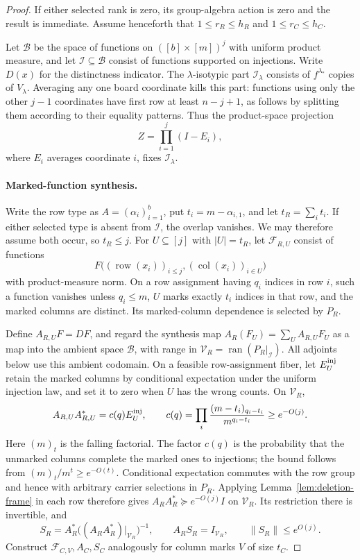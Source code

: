 \begin{proof}
If either selected rank is zero, its group-algebra action is zero and the result is immediate. Assume henceforth that $1\le r_R\le h_R$ and $1\le r_C\le h_C$.

Let $\mathcal B$ be the space of functions on $([b]\times[m])^j$ with uniform product measure, and let $\mathcal I\subseteq\mathcal B$ consist of functions supported on injections. Write $D(x)$ for the distinctness indicator. The $\lambda$-isotypic part $\mathcal I_\lambda$ consists of $f^{\lambda_*}$ copies of $V_\lambda$. Averaging any one board coordinate kills this part: functions using only the other $j-1$ coordinates have first row at least $n-j+1$, as follows by splitting them according to their equality patterns. Thus the product-space projection
\[
 Z=\prod_{i=1}^j(I-E_i),
\]
where $E_i$ averages coordinate $i$, fixes $\mathcal I_\lambda$.

\paragraph{Marked-function synthesis.}
Write the row type as $A=(\alpha_i)_{i=1}^b$, put $t_i=m-\alpha_{i,1}$, and let $t_R=\sum_i t_i$. If either selected type is absent from $\mathcal I$, the overlap vanishes. We may therefore assume both occur, so $t_R\le j$. For $U\subseteq[j]$ with $|U|=t_R$, let $\mathcal F_{R,U}$ consist of functions
\begin{equation}
 F\big((\operatorname{row}(x_i))_{i\le j},
       (\operatorname{col}(x_i))_{i\in U}\big)
 \label{ten:frames:eq:7}
\end{equation}
with product-measure norm. On a row assignment having $q_i$ indices in row $i$, such a function vanishes unless $q_i\le m$, $U$ marks exactly $t_i$ indices in that row, and the marked columns are distinct. Its marked-column dependence is selected by $P_R$.

Define $A_{R,U}F=DF$, and regard the synthesis map
$A_R(F_U)=\sum_U A_{R,U}F_U$ as a map into the ambient space $\mathcal B$, with range in $\mathcal V_R=\operatorname{ran}(P_R|_{\mathcal I})$. All adjoints below use this ambient codomain. On a feasible row-assignment fiber, let $E_U^{\rm inj}$ retain the marked columns by conditional expectation under the uniform injection law, and set it to zero when $U$ has the wrong counts. On $\mathcal V_R$,
\[
 A_{R,U}A_{R,U}^*=c(q)E_U^{\rm inj},\qquad
 c(q)=\prod_i\frac{(m-t_i)_{q_i-t_i}}{m^{q_i-t_i}}\ge e^{-O(j)}.
\]
Here $(m)_t$ is the falling factorial. The factor $c(q)$ is the probability that the unmarked columns complete the marked ones to injections; the bound follows from $(m)_t/m^t\ge e^{-O(t)}$. Conditional expectation commutes with the row group and hence with arbitrary carrier selections in $P_R$. Applying Lemma~\ref{lem:deletion-frame} in each row therefore gives $A_RA_R^*\succeq e^{-O(j)}I$ on $\mathcal V_R$. Its restriction there is invertible, and
\[
 S_R=A_R^*\big((A_RA_R^*)|_{\mathcal V_R}\big)^{-1},\qquad
 A_RS_R=I_{\mathcal V_R},\qquad \|S_R\|\le e^{O(j)}.
\]
Construct $\mathcal F_{C,V},A_C,S_C$ analogously for column marks $V$ of size $t_C$.


\end{proof}
